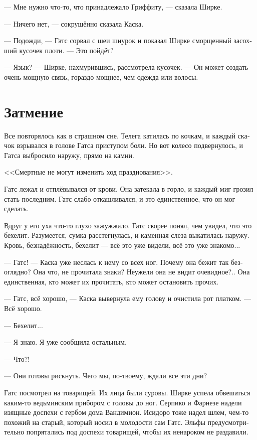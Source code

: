 \documentclass[a4paper,12pt,fleqn]{book}\usepackage{polyglossia}\setdefaultlanguage[babelshorthands=true]{russian}\setotherlanguage{english}\defaultfontfeatures{Ligatures=TeX,Mapping=tex-text}\usepackage{xcolor}\newcommand{\ml}[3]{#2}
\begin{document}
--- Мне нужно что-то, что принадлежало Гриффиту, --- сказала Ширке.

--- Ничего нет, --- сокрушённо сказала Каска.

--- Подожди, --- Гатс сорвал с шеи шнурок и показал Ширке сморщенный засохший кусочек плоти.
--- Это пойдёт?

--- Язык? --- Ширке, нахмурившись, рассмотрела кусочек.
--- Он может создать очень мощную связь, гораздо мощнее, чем одежда или волосы.

\section{Затмение}

Все повторялось как в страшном сне.
Телега катилась по кочкам, и каждый скачок взрывался в голове Гатса приступом боли.
Но вот колесо подвернулось, и Гатса выбросило наружу, прямо на камни.

<<Смертные не могут изменить ход празднования>>.

Гатс лежал и отплёвывался от крови.
Она затекала в горло, и каждый миг грозил стать последним.
Гатс слабо откашливался, и это единственное, что он мог сделать.

Вдруг у его уха что-то глухо зажужжало.
Гатс скорее понял, чем увидел, что это бехелит.
Разумеется, сумка расстегнулась, и каменная слеза выкатилась наружу.
Кровь, безнадёжность, бехелит --- всё это уже видели, всё это уже знакомо...

--- Гатс! --- Каска уже неслась к нему со всех ног.
Почему она бежит так безоглядно?
Она что, не прочитала знаки?
Неужели она не видит очевидное?..
Она единственная, кто может их прочитать, кто может остановить прочих.

--- Гатс, всё хорошо, --- Каска вывернула ему голову и очистила рот платком.
--- Всё хорошо.

--- Бехелит...

--- Я знаю.
Я уже сообщила остальным.

--- Что?!

--- Они готовы рискнуть.
Чего мы, по-твоему, ждали все эти дни?

Гатс посмотрел на товарищей.
Их лица были суровы.
Ширке успела обвешаться каким-то ведьминским прибором с головы до ног.
Серпико и Фарнезе надели изящные доспехи с гербом дома Вандимион.
Исидоро тоже надел шлем, чем-то похожий на старый, который носил в молодости сам Гатс.
Эльфы предусмотрительно попрятались под доспехи товарищей, чтобы их ненароком не раздавили.
\end{document}
